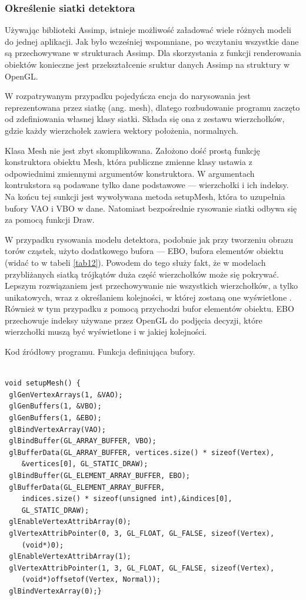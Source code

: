 \subsubsection{Określenie siatki detektora}
Używając biblioteki Assimp, istnieje możliwość załadować wiele różnych modeli do jednej aplikacji. Jak było wcześniej wspomniane, po wczytaniu wszystkie dane są przechowywane w strukturach Assimp. Dla skorzystania z funkcji renderowania obiektów konieczne jest przekształcenie sruktur danych Assimp na struktury w OpenGL. 

W rozpatrywanym przypadku pojedyńcza encja do narysowania jest reprezentowana przez siatkę (ang. mesh), dlatego rozbudowanie programu zaczęto od zdefiniowania własnej klasy siatki. Składa się ona z zestawu wierzchołków, gdzie każdy wierzchołek zawiera wektory położenia, normalnych.

Klasa Mesh nie jest zbyt skomplikowana. Założono dość prostą funkcję konstruktora obiektu Mesh, która publiczne zmienne klasy ustawia  z odpowiednimi zmiennymi argumentów konstruktora. W argumentach kontrukstora są podawane tylko dane podstawowe --- wierzchołki i ich indeksy. Na końcu tej sunkcji jest wywoływana metoda setupMesh, która to uzupełnia bufory VAO i VBO w dane. Natomiast bezpośrednie rysowanie siatki odbywa się za pomocą funkcji Draw.

W przypadku rysowania modelu detektora, podobnie jak przy tworzeniu obrazu torów cząstek, użyto dodatkowego bufora --- EBO, bufora elementów obiektu (widać to w tabeli \ref{tab12}). Powodem do tego służy fakt, że w modelach przybliżanych siatką trójkątów duża część wierzchołków może się pokrywać. Lepszym rozwiązaniem jest przechowywanie nie wszystkich wierzchołków, a tylko unikatowych, wraz z określaniem kolejności, w której zostaną one wyświetlone \cite{learnopengl}. Również w tym przypadku z pomocą przychodzi bufor elementów obiektu. EBO przechowuje indeksy używane przez OpenGL do podjęcia decyzji, które wierzchołki muszą być wyświetlone i w jakiej kolejności.

\begin{table}[H]
\caption{Kod źródłowy programu. Funkcja definiująca bufory.}
\label{tab12}
\begin{lstlisting}[frame=single]  % Start your code-block

void setupMesh() {
 glGenVertexArrays(1, &VAO);
 glGenBuffers(1, &VBO);
 glGenBuffers(1, &EBO);
 glBindVertexArray(VAO);
 glBindBuffer(GL_ARRAY_BUFFER, VBO);
 glBufferData(GL_ARRAY_BUFFER, vertices.size() * sizeof(Vertex), 
 	&vertices[0], GL_STATIC_DRAW);
 glBindBuffer(GL_ELEMENT_ARRAY_BUFFER, EBO);
 glBufferData(GL_ELEMENT_ARRAY_BUFFER, 
 	indices.size() * sizeof(unsigned int),&indices[0], 
 	GL_STATIC_DRAW);
 glEnableVertexAttribArray(0);
 glVertexAttribPointer(0, 3, GL_FLOAT, GL_FALSE, sizeof(Vertex), 
 	(void*)0);
 glEnableVertexAttribArray(1);
 glVertexAttribPointer(1, 3, GL_FLOAT, GL_FALSE, sizeof(Vertex),
 	(void*)offsetof(Vertex, Normal));
 glBindVertexArray(0);}
\end{lstlisting}
\end{table}


